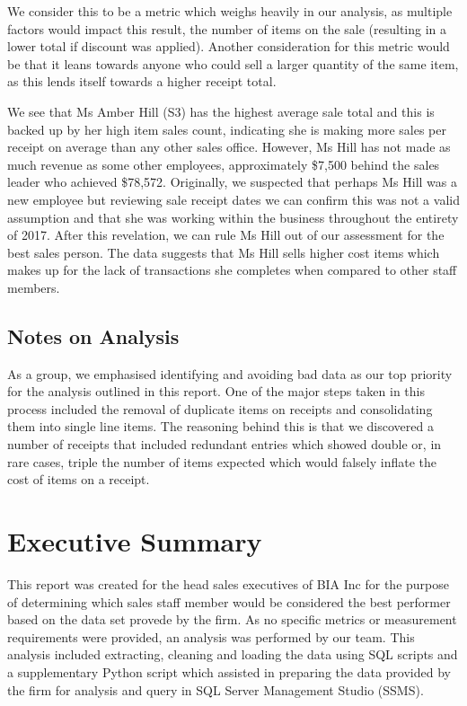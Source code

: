 \documentclass{article}
\begin{document}
            We consider this to be a metric which weighs heavily in our analysis,
            as multiple factors would impact this result, the number of items on the sale
            (resulting in a lower total if discount was applied). Another consideration 
            for this metric would be that it leans towards anyone who could
            sell a larger quantity of the same item, as this lends itself towards a higher
            receipt total. 
			
			\par
			We see that Ms Amber Hill (S3) has the highest average sale total and this is backed up by
			her high item sales count, indicating she is making more sales per receipt on average than
			any other sales office. 
			However, Ms Hill has not made as much revenue as some other employees, approximately \$7,500
			behind the sales leader who achieved \$78,572. Originally, we suspected that perhaps Ms Hill
			was a new employee but reviewing sale receipt dates we can confirm this was not a valid
			assumption and that she was working within the business throughout the entirety of 2017.
			After this revelation, we can rule Ms Hill out of our assessment for the best sales person.
			The data suggests that Ms Hill sells higher cost items which makes up for the lack of
			transactions she completes when compared to other staff members. 
			
        \subsection{Notes on Analysis}
			As a group, we emphasised identifying and avoiding bad data as our top priority for
			the analysis outlined in this report. One of the major steps taken in this process 
			included
			the removal of duplicate items on receipts and consolidating them into single line
			items. The reasoning behind this is that we discovered a number of receipts that
			included redundant entries which showed double or, in rare cases, triple the number
			of items expected which would falsely inflate the cost of items on a receipt.

    \newpage
    
    
    
    \section{Executive Summary}
    \label{sec:Executive Summary}
	This report was created for the head sales executives of BIA Inc for the purpose of
	determining which sales staff member would be considered the best performer based on
	the data set provede by the firm. As no specific metrics or measurement requirements
	were provided, an analysis was performed by our team. This analysis included extracting,
	cleaning and loading the data using SQL scripts and a supplementary Python script which
	assisted in preparing the data provided by the firm for analysis and query in SQL Server
	Management Studio (SSMS). 
    \vspace{5mm}
    \par\noindent
    
\end{document}
